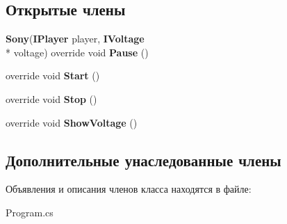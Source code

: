 \subsection*{Открытые члены}
\begin{DoxyCompactItemize}
\item 
{\bf Sony}({\bf I\-Player} player, {\bf I\-Voltage} \\*
voltage) override void {\bfseries Pause} ()\label{class_player___power_1_1_sony_a0a5ccde69df5a76581b50aa998763a1d}

\item 
override void {\bfseries Start} ()\label{class_player___power_1_1_sony_aecac16b26e060cc06f333ec92f9b58c4}

\item 
override void {\bfseries Stop} ()\label{class_player___power_1_1_sony_ab60d2550b44812f29357e1e5917c836e}

\item 
override void {\bfseries Show\-Voltage} ()\label{class_player___power_1_1_sony_a11c31dd40894bbccb3672084529359be}

\end{DoxyCompactItemize}
\subsection*{Дополнительные унаследованные члены}


Объявления и описания членов класса находятся в файле\-:\begin{DoxyCompactItemize}
\item 
Program.\-cs\end{DoxyCompactItemize}
